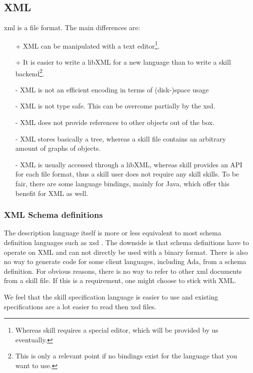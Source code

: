 \subsection*{XML}

\gls{xml} is a file format. The main differences are:
\begin{itemize}
 \item[+] XML can be manipulated with a text editor\footnote{Whereas skill requires a special editor, which will be provided by us eventually.}.
 \item[+] It is easier to write a libXML for a new language than to write a \gls{skill} backend\footnote{This is only a relevant point if no bindings exist for the language that you want to use.}.
 \item[-] XML is not an efficient encoding in terms of (disk-)space usage
 \item[-] XML is not type safe. This can be overcome partially by the \gls{xsd}.
 \item[-] XML does not provide references to other objects out of the box.
 \item[-] XML stores basically a tree, whereas a skill file contains an arbitrary amount of graphs of objects.
 \item[-] XML is usually accessed through a libXML, whereas \gls{skill} provides an API for each file format, thus a skill user does not require any \gls{skill} skills. To be fair, there are some language bindings, mainly for Java, which offer this benefit for XML as well.
\end{itemize}

\subsubsection*{XML Schema definitions}

The description language itself is more or less equivalent to most schema definition languages such as \gls{xsd} . The downside is that schema definitions have to operate on XML and can not directly be used with a binary format. There is also
no way to generate code for some client languages, including Ada, from a schema definition. For obvious reasons, there is no way to refer to other \gls{xml} documents from a \gls{skill} file. If this is a requirement, one might choose to stick with XML.

We feel that the \gls{skill} specification language is easier to use and existing specifications are a lot easier to read then \gls{xsd} files.

